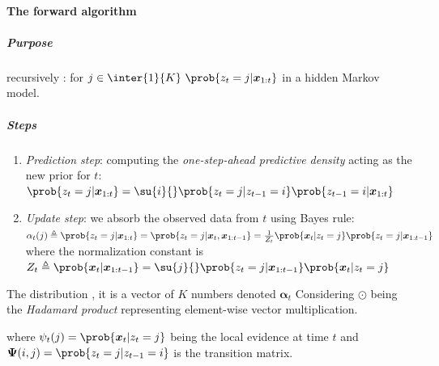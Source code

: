 \paragraph{The forward algorithm}
\subparagraph{Purpose} recursively : for $j\in\inter{1}{K}~
\prob{z_{t}=j|\bm{x}_{1:t}}$ in a hidden Markov model.
\subparagraph{Steps}
\begin{enumerate}
    \item \emph{Prediction step}: computing the \emph{one-step-ahead predictive 
        density} acting as the new prior for $t$:\\ $\prob{z_{t}=j|\bm{x}_{1:t}} =
        \su{i}{} \prob{z_{t}=j| z_{t-1}=i}\prob{z_{t-1}=i|\bm{x}_{1:t}}$
    \item \emph{Update step}: we absorb the observed data from $t$ using Bayes rule:\\
        $\alpha_{t}(j) \triangleq \prob{z_{t}=j| \bm{x}_{1:t}} = \prob{z_{
            t}=j| \bm{x}_{t}, \bm{x}_{1:t-1}} = \frac{1}{Z_{t}}\prob{\bm{x}_{
        t}|z_{t}=j} \prob{z_{t}=j|\bm{x}_{1:t-1}}$ 
        where  the normalization constant is $Z_{t} \triangleq \prob{\bm{x}_{t}|
        \bm{x}_{1:t-1}}=\su{j}{}\prob{z_{t}=j|\bm{x}_{1:t-1}}\prob{\bm{x}_{t}|z_{t}=j}$
\end{enumerate}
The distribution ,
it is a vector of $K$ numbers denoted $\bm{\alpha}_{t}$
Considering $\odot$ being the \emph{Hadamard product} representing element-wise vector 
multiplication.
\begin{center}
\end{center}
where $\psi_{t}(j) = \prob{\bm{x}_{t}|z_{t}=j}$ being the local evidence at time $t$ and $\bm{\Psi}(
i,j)=\prob{z_{t}=j|z_{t-1}=i}$ is the transition matrix.

